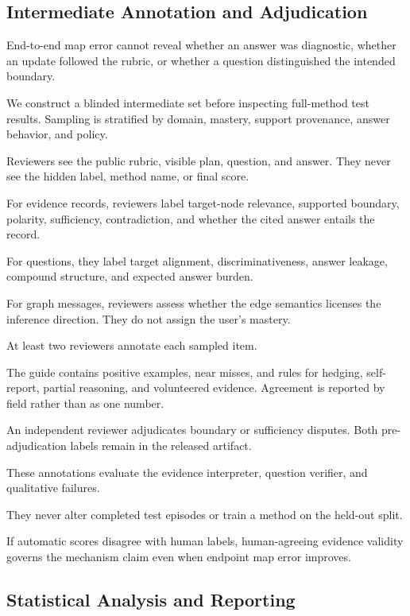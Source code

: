 \subsection{Intermediate Annotation and Adjudication}

End-to-end map error cannot reveal whether an answer was diagnostic, whether an update followed the
rubric, or whether a question distinguished the intended boundary.

We construct a blinded intermediate set before inspecting full-method test results. Sampling is
stratified by domain, mastery, support provenance, answer behavior, and policy.

Reviewers see the public rubric, visible plan, question, and answer. They never see the hidden label,
method name, or final score.

For evidence records, reviewers label target-node relevance, supported boundary, polarity, sufficiency,
contradiction, and whether the cited answer entails the record.

For questions, they label target alignment, discriminativeness, answer leakage, compound structure, and
expected answer burden.

For graph messages, reviewers assess whether the edge semantics licenses the inference direction. They
do not assign the user's mastery.

At least two reviewers annotate each sampled item.

The guide contains positive examples, near misses, and rules for hedging, self-report, partial reasoning,
and volunteered evidence. Agreement is reported by field rather than as one number.

An independent reviewer adjudicates boundary or sufficiency disputes. Both pre-adjudication labels
remain in the released artifact.

These annotations evaluate the evidence interpreter, question verifier, and qualitative failures.

They never alter completed test episodes or train a method on the held-out split.

If automatic scores disagree with human labels, human-agreeing evidence validity governs the mechanism
claim even when endpoint map error improves.

\subsection{Statistical Analysis and Reporting}

